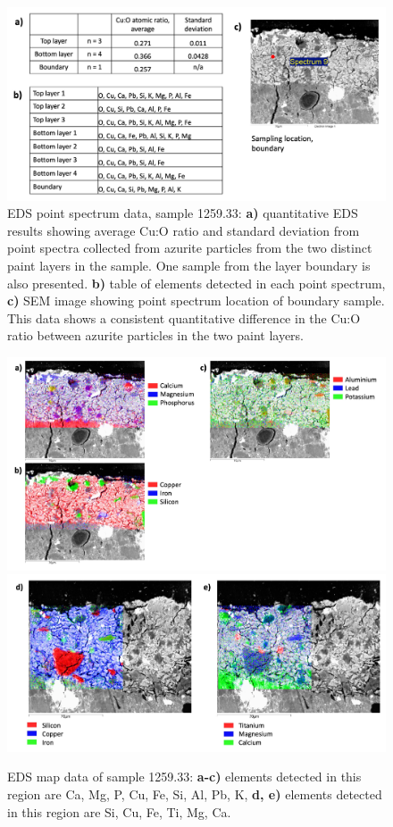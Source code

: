 \begin{figure}[H]
  \centering
  \includegraphics[width=0.8\linewidth]{1259.33_eds_pointspec}
\caption[EDS point spectrum data, sample 1259.33.]{EDS point spectrum data, sample 1259.33: \textbf{a)} quantitative EDS results showing average Cu:O ratio and standard deviation from point spectra collected from azurite particles from the two distinct paint layers in the sample. One sample from the layer boundary is also presented. \textbf{b)} table of elements detected in each point spectrum, \textbf{c)} SEM image showing point spectrum location of boundary sample. This data shows a consistent quantitative difference in the Cu:O ratio between azurite particles in the two paint layers.}
\label{fig:1259.33_pointspec}
\end{figure}

\begin{figure}[H]
\centering
\begin{minipage}[t]{\linewidth}
  \centering
  \includegraphics[width=0.9\linewidth]{1259.33_mapdata_1}
\hfill
\includegraphics[width=0.9\linewidth]{1259.33_mapdata_2}
\hfill
\end{minipage}
\caption[EDS map data, sample 1259.33.]{EDS map data of sample 1259.33: \textbf{a-c)} elements detected in this region are Ca, Mg, P, Cu, Fe, Si, Al, Pb, K, \textbf{d, e)} elements detected in this region are Si, Cu, Fe, Ti, Mg, Ca.}
\label{fig:1259.33_mapdata}
\end{figure}

